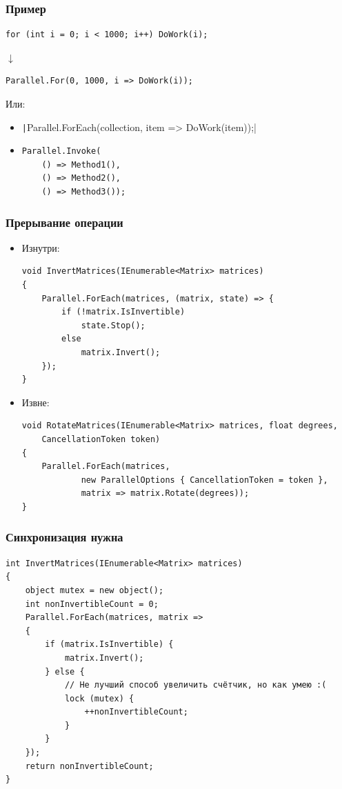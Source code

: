 \documentclass[xetex,mathserif,serif]{beamer}
\newcommand{\DownArrow} {
	\hspace{2cm}\begin{LARGE}$\downarrow$\end{LARGE}
}
\begin{document}
	\begin{frame}[fragile]
		\frametitle{Пример}
		\begin{verbatim}
for (int i = 0; i < 1000; i++) DoWork(i);
		\end{verbatim}
		\DownArrow
		\begin{verbatim}
Parallel.For(0, 1000, i => DoWork(i));
		\end{verbatim}

		Или:
		\begin{itemize}
			\item \texttt|Parallel.ForEach(collection, item => DoWork(item));|
			\item 
				\begin{verbatim}
Parallel.Invoke(
    () => Method1(),
    () => Method2(),
    () => Method3());
				\end{verbatim}
		\end{itemize}
	\end{frame}

	\begin{frame}[fragile]
		\frametitle{Прерывание операции}
		\begin{itemize}
			\item Изнутри:
			\begin{footnotesize}
				\begin{verbatim}
void InvertMatrices(IEnumerable<Matrix> matrices)
{
    Parallel.ForEach(matrices, (matrix, state) => {
        if (!matrix.IsInvertible)
            state.Stop();
        else
            matrix.Invert();
    });
}
				\end{verbatim}
			\end{footnotesize}

			\item Извне:
			\begin{footnotesize}
				\begin{verbatim}
void RotateMatrices(IEnumerable<Matrix> matrices, float degrees,
    CancellationToken token)
{
    Parallel.ForEach(matrices,
            new ParallelOptions { CancellationToken = token },
            matrix => matrix.Rotate(degrees));
}
				\end{verbatim}
			\end{footnotesize}
		\end{itemize}
	\end{frame}

	\begin{frame}[fragile]
		\frametitle{Синхронизация нужна}
		\begin{footnotesize}
			\begin{verbatim}
int InvertMatrices(IEnumerable<Matrix> matrices)
{
    object mutex = new object();
    int nonInvertibleCount = 0;
    Parallel.ForEach(matrices, matrix =>
    {
        if (matrix.IsInvertible) {
            matrix.Invert();
        } else {
            // Не лучший способ увеличить счётчик, но как умею :(
            lock (mutex) {
                ++nonInvertibleCount;
            }
        }
    });
    return nonInvertibleCount;
}
			\end{verbatim}
		\end{footnotesize}
	\end{frame}
\end{document}
